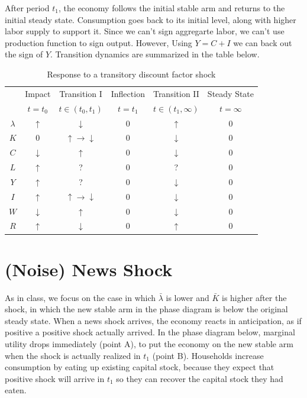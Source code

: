 \documentclass[11pt]{amsart}
\begin{document}
After period $t_1$, the economy follows the initial stable arm and returns to the initial steady state. Consumption goes back to its initial level, along with higher labor supply to support it. Since we can't sign aggregarte labor, we can't use production function to sign output. However, Using $Y = C+ I$ we can back out the sign of $Y$. Transition dynamics are summarized in the table below.   
\begin{table}[H]
	\centering
	\begin{tabular}{cccccc}
		\hline \hline 
		& Impact  & Transition I          & Inflection & Transition II & Steady State  \\
		& $t=t_0$ & $t \in (t_0, t_1)$ & $t = t_1$ & $t \in (t_1, \infty)$ & $t = \infty$ \\
		\hline 
		$\lambda$ &  $\uparrow$    &    $\downarrow$     &    0     & $\uparrow$ &0     \\
		$K$           &      0                &    $\uparrow \rightarrow \downarrow$  &   0      & $\downarrow$ &    0\\
		$C$          & $\downarrow$ &   $\uparrow$      &   0      & $\downarrow$ &    0\\
		$L$          &   $\uparrow$    &   ?      & 0     &  ? &      0\\
		$Y$          &    $\uparrow$   &    ?    &    0    &  $\downarrow$  &      0\\
		$I$           &   $\uparrow$    &  $\uparrow \rightarrow \downarrow$  & 0 & $\downarrow$  &    0\\
		$W$         & $\downarrow$ &    $\uparrow$     &    0     & $\downarrow$ &  0   \\
		$R$          &  $\uparrow$    &     $\downarrow$     &    0     & $\uparrow$  &  0 \\
		\hline
	\end{tabular}
	\caption{Response to a transitory discount factor shock}
\end{table}


\section{(Noise) News Shock}
As in class, we focus on the case in which $\bar{\lambda}$ is lower and $\bar{K}$ is higher after the shock, in which the new stable arm in the phase diagram is below the original steady state. When a news shock arrives, the economy reacts in anticipation, as if positive a positive shock actually arrived. In the phase diagram below, marginal utility drops immediately (point A), to put the economy on the new stable arm when the shock is actually realized in $t_1$ (point B). Households increase consumption by eating up existing capital stock, because they expect that positive shock will arrive in $t_1$ so they can recover the capital stock they had eaten. 
\end{document}

